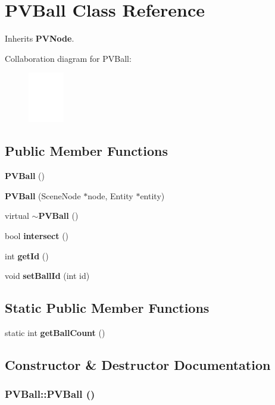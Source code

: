 \section{PVBall Class Reference}
\label{class_p_v_ball}
Inherits {\bf PVNode}.

Collaboration diagram for PVBall:\nopagebreak
\begin{figure}[H]
\begin{center}
\leavevmode
\includegraphics[width=44pt]{class_p_v_ball__coll__graph}
\end{center}
\end{figure}
\subsection*{Public Member Functions}
\begin{CompactItemize}
\item 
{\bf PVBall} ()
\item 
{\bf PVBall} (SceneNode $\ast$node, Entity $\ast$entity)
\item 
virtual {\bf $\sim$PVBall} ()
\item 
bool {\bf intersect} ()
\item 
int {\bf getId} ()
\item 
void {\bf setBallId} (int id)
\end{CompactItemize}
\subsection*{Static Public Member Functions}
\begin{CompactItemize}
\item 
static int {\bf getBallCount} ()
\end{CompactItemize}


\subsection{Constructor \& Destructor Documentation}
\subsubsection[{PVBall}]{\setlength{\rightskip}{0pt plus 5cm}PVBall::PVBall ()}\label{class_p_v_ball_86502630f0f62a9a51f7c51bf9519409}


